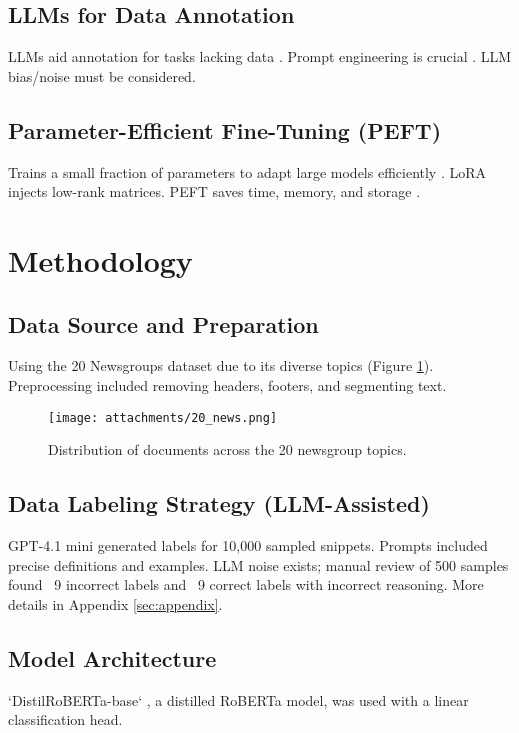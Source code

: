 \documentclass{article}
\begin{document}
\subsection{LLMs for Data Annotation}
\label{sec:related_work:llm_annotation}
LLMs aid annotation for tasks lacking data \citep{tan2024largelanguagemodelsdata}. Prompt engineering is crucial \citep{brown2020language}. LLM bias/noise must be considered.

\subsection{Parameter-Efficient Fine-Tuning (PEFT)}
\label{sec:related_work:peft}
Trains a small fraction of parameters to adapt large models efficiently \citep{han2024parameterefficientfinetuninglargemodels}. LoRA \citep{hu2021LoRAlowrankadaptationlarge} injects low-rank matrices. PEFT saves time, memory, and storage \citep{pfeiffer2020AdapterHub, peft}.

\section{Methodology}
\label{sec:methodology}
\subsection{Data Source and Preparation}
\label{sec:methodology:datasource}
Using the 20 Newsgroups dataset \citep{twenty_newsgroups_113} due to its diverse topics (Figure \ref{fig:20ng_topics}). Preprocessing included removing headers, footers, and segmenting text.

\begin{figure}[h!]
\centering
\texttt{[image: attachments/20\_news.png]} %
\caption{Distribution of documents across the 20 newsgroup topics.}
\label{fig:20ng_topics}
\end{figure}

\subsection{Data Labeling Strategy (LLM-Assisted)}
\label{sec:methodology:llm_labeling}
GPT-4.1 mini generated labels for 10,000 sampled snippets. Prompts included precise definitions and examples. LLM noise exists; manual review of 500 samples found ~9 incorrect labels and ~9 correct labels with incorrect reasoning. More details in Appendix \ref{sec:appendix}.

\subsection{Model Architecture}
\label{sec:methodology:architecture}
`DistilRoBERTa-base` \citep{sanh2020distilbertdistilledversionbert}, a distilled RoBERTa model, was used with a linear classification head.
\end{document}
